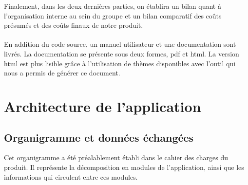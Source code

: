 	Finalement, dans les deux dernières parties, on établira un bilan quant à l'organisation interne au sein du groupe et un bilan comparatif des coûts présumés et des coûts finaux de notre produit.
	
	\paragraph{}En addition du code source, un manuel utilisateur et une documentation sont livrés. La documentation se présente sous deux formes, pdf et html. La version html est plus lisible grâce à l'utilisation de thèmes disponibles avec l'outil qui nous a permis de générer ce document.
	\section{Architecture de l'application}
		\subsection{Organigramme et données échangées}
		Cet organigramme a été préalablement établi dans le cahier des charges du produit. Il représente la décomposition en modules de l'application, ainsi que les informations qui circulent entre ces modules.
		
